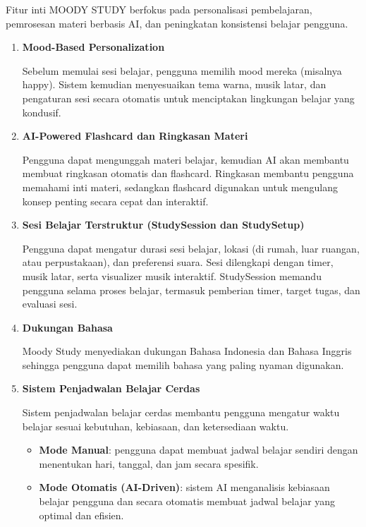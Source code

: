 \documentclass[11pt]{article}
\begin{document}
Fitur inti MOODY STUDY berfokus pada personalisasi pembelajaran, pemrosesan materi berbasis AI, dan peningkatan konsistensi belajar pengguna.

\begin{enumerate}

\item \textbf{Mood-Based Personalization}

Sebelum memulai sesi belajar, pengguna memilih mood mereka (misalnya happy). Sistem kemudian menyesuaikan tema warna, musik latar, dan pengaturan sesi secara otomatis untuk menciptakan lingkungan belajar yang kondusif.

\item \textbf{AI-Powered Flashcard dan Ringkasan Materi}

Pengguna dapat mengunggah materi belajar, kemudian AI akan membantu membuat ringkasan otomatis dan flashcard. Ringkasan membantu pengguna memahami inti materi, sedangkan flashcard digunakan untuk mengulang konsep penting secara cepat dan interaktif.

\item \textbf{Sesi Belajar Terstruktur (StudySession dan StudySetup)}

Pengguna dapat mengatur durasi sesi belajar, lokasi (di rumah, luar ruangan, atau perpustakaan), dan preferensi suara. Sesi dilengkapi dengan timer, musik latar, serta visualizer musik interaktif. StudySession memandu pengguna selama proses belajar, termasuk pemberian timer, target tugas, dan evaluasi sesi.

\item \textbf{Dukungan Bahasa}

Moody Study menyediakan dukungan Bahasa Indonesia dan Bahasa Inggris sehingga pengguna dapat memilih bahasa yang paling nyaman digunakan.

\item \textbf{Sistem Penjadwalan Belajar Cerdas}

Sistem penjadwalan belajar cerdas membantu pengguna mengatur waktu belajar sesuai kebutuhan, kebiasaan, dan ketersediaan waktu.

\begin{itemize}
\item \textbf{Mode Manual}: pengguna dapat membuat jadwal belajar sendiri dengan menentukan hari, tanggal, dan jam secara spesifik.

\item \textbf{Mode Otomatis (AI-Driven)}: sistem AI menganalisis kebiasaan belajar pengguna dan secara otomatis membuat jadwal belajar yang optimal dan efisien.


\end{itemize}
\end{enumerate}
\end{document}
